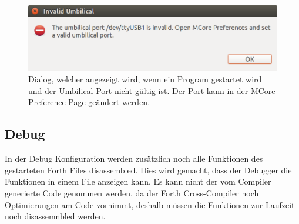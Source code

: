 \begin{figure}[H]
	\centering
		\includegraphics[scale=0.4]{launch/invalidumbilical.png}
		\caption{Dialog, welcher angezeigt wird, wenn ein Program gestartet wird und der Umbilical Port nicht gültig ist. Der Port kann in der MCore Preference Page geändert werden.}
		\label{fig:invalidumbilical}
\end{figure}

\subsection{Debug}

In der Debug Konfiguration werden zusätzlich noch alle Funktionen des gestarteten Forth Files disassembled. Dies wird gemacht, dass der Debugger die Funktionen in einem File anzeigen kann. Es kann nicht der vom Compiler generierte Code genommen werden, da der Forth Cross-Compiler noch Optimierungen am Code vornimmt, deshalb müssen die Funktionen zur Laufzeit noch disassemnbled werden.

